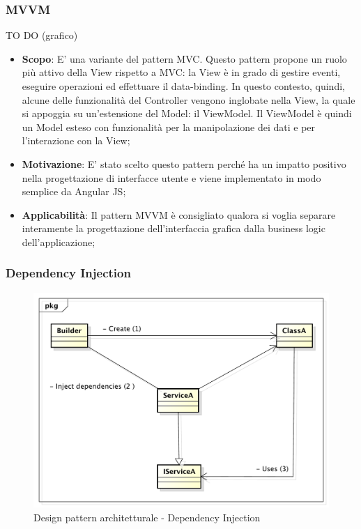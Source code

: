 		\newpage
		\subsubsection{MVVM} %
		TO DO (grafico)

		\begin{itemize}
			\item \textbf{Scopo}: E' una variante del pattern MVC. Questo pattern propone un ruolo più attivo della View rispetto a MVC: la View è in grado di gestire eventi, eseguire operazioni ed effettuare il data-binding. In questo contesto, quindi, alcune delle funzionalità del Controller vengono inglobate nella View, la quale si appoggia su un'estensione del Model: il ViewModel.
Il ViewModel è quindi un Model esteso con funzionalità per la manipolazione dei dati e per l'interazione con la View;

			\item \textbf{Motivazione}: E' stato scelto questo pattern perché ha un impatto positivo nella progettazione di interfacce utente e viene implementato in modo semplice da Angular JS;

			\item \textbf{Applicabilità}: Il pattern MVVM è consigliato qualora si voglia separare interamente la progettazione dell'interfaccia grafica dalla business logic dell'applicazione;

		\end{itemize}

		\newpage
		\subsubsection{Dependency Injection} %

		\begin{figure}[htbp]
			\centering
			\centerline{\includegraphics[scale=0.5]{./images/designpatternappendice/dep_injection.pdf}}
			\caption{Design pattern architetturale - Dependency Injection}
		\end{figure}

